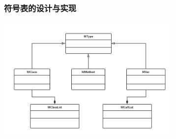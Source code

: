\documentclass[11pt, oneside]{article}   	%
\begin{document}
\begin{spacing}{1.55}
	\subsubsection{符号表的设计与实现}
	\begin{enumerate}
	\paragraph{}
	\includegraphics[height=170pt]{4.png}
	\end{enumerate}

\end{spacing}
\end{document}

